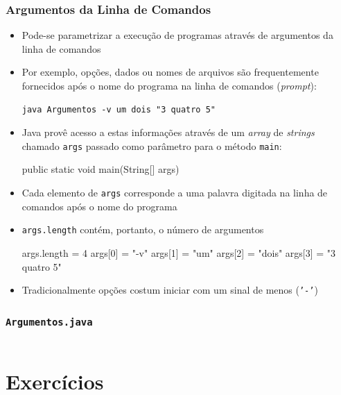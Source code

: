 \documentclass[xcolor={dvipsnames,table},aspectratio=169]{beamer}
\begin{document}
\begin{frame}[fragile]\frametitle{Argumentos da Linha de Comandos}
\begin{itemize}
	\item Pode-se parametrizar a execução de programas através de argumentos da linha de comandos
	\item Por exemplo, opções, dados ou nomes de arquivos são frequentemente fornecidos após o nome do programa na linha de comandos (\emph{prompt}):
{\scriptsize
\begin{verbatim}
java Argumentos -v um dois "3 quatro 5"
\end{verbatim}
}
	\item Java provê acesso a estas informações através de um \emph{array} de \emph{strings} chamado \texttt{args} passado como parâmetro para o método \texttt{main}:
{\scriptsize
\begin{javacode}
public static void main(String[] args)
\end{javacode}
}
	\item Cada elemento de \texttt{args} corresponde a uma palavra digitada na linha de comandos após o nome do programa
	\item \texttt{args.length} contém, portanto, o número de argumentos
{\scriptsize
\begin{javacode}
args.length = 4
args[0] = "-v"
args[1] = "um"
args[2] = "dois"
args[3] = "3 quatro 5"
\end{javacode}
}
	\item Tradicionalmente opções costum iniciar com um sinal de menos (\texttt{'-'})
\end{itemize}
\end{frame}

\begin{frame}[fragile]\frametitle{\texttt{Argumentos.java}}
\tiny{\inputminted[bgcolor=cyan!10]{java}{src/Argumentos.java}}
\end{frame}

\section{Exercícios}
\end{document}
